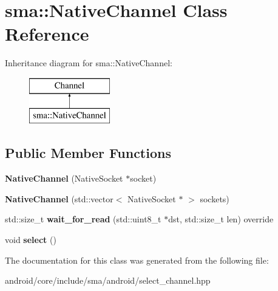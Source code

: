 \hypertarget{classsma_1_1NativeChannel}{\section{sma\-:\-:Native\-Channel Class Reference}
\label{classsma_1_1NativeChannel}
}
Inheritance diagram for sma\-:\-:Native\-Channel\-:\begin{figure}[H]
\begin{center}
\leavevmode
\includegraphics[height=2.000000cm]{classsma_1_1NativeChannel}
\end{center}
\end{figure}
\subsection*{Public Member Functions}
\begin{DoxyCompactItemize}
\item 
\hypertarget{classsma_1_1NativeChannel_a881188f3abc8d7efe7d51d487241336f}{{\bfseries Native\-Channel} (Native\-Socket $\ast$socket)}\label{classsma_1_1NativeChannel_a881188f3abc8d7efe7d51d487241336f}

\item 
\hypertarget{classsma_1_1NativeChannel_ae9d90e3a5e2b7f8632da8e6412a9a9d8}{{\bfseries Native\-Channel} (std\-::vector$<$ Native\-Socket $\ast$ $>$ sockets)}\label{classsma_1_1NativeChannel_ae9d90e3a5e2b7f8632da8e6412a9a9d8}

\item 
\hypertarget{classsma_1_1NativeChannel_a752a87f5c84b60cfeee7c2efad575c37}{std\-::size\-\_\-t {\bfseries wait\-\_\-for\-\_\-read} (std\-::uint8\-\_\-t $\ast$dst, std\-::size\-\_\-t len) override}\label{classsma_1_1NativeChannel_a752a87f5c84b60cfeee7c2efad575c37}

\item 
\hypertarget{classsma_1_1NativeChannel_a61802878daf5645c92eb3b149b1c9d53}{void {\bfseries select} ()}\label{classsma_1_1NativeChannel_a61802878daf5645c92eb3b149b1c9d53}

\end{DoxyCompactItemize}


The documentation for this class was generated from the following file\-:\begin{DoxyCompactItemize}
\item 
android/core/include/sma/android/select\-\_\-channel.\-hpp\end{DoxyCompactItemize}
